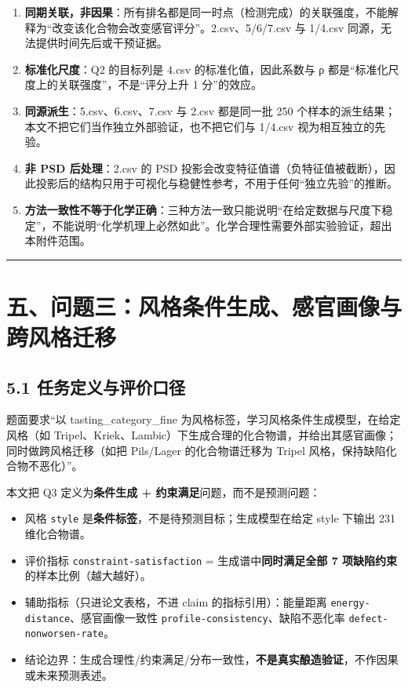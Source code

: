 \documentclass[
  11pt,
]{ctexart}
\providecommand{\tightlist}{%
  \setlength{\itemsep}{0pt}\setlength{\parskip}{0pt}}
\begin{document}
\begin{enumerate}
\def\labelenumi{\arabic{enumi}.}
\tightlist
\item
  \textbf{同期关联，非因果}：所有排名都是同一时点（检测完成）的关联强度，不能解释为``改变该化合物会改变感官评分''。2.csv、5/6/7.csv
  与 1/4.csv 同源，无法提供时间先后或干预证据。
\item
  \textbf{标准化尺度}：Q2 的目标列是 4.csv 的标准化值，因此系数与
  \textbar ρ\textbar{} 都是``标准化尺度上的关联强度''，不是``评分上升 1
  分''的效应。
\item
  \textbf{同源派生}：5.csv、6.csv、7.csv 与 2.csv 都是同一批 250
  个样本的派生结果；本文不把它们当作独立外部验证，也不把它们与 1/4.csv
  视为相互独立的先验。
\item
  \textbf{非 PSD 后处理}：2.csv 的 PSD
  投影会改变特征值谱（负特征值被截断），因此投影后的结构只用于可视化与稳健性参考，不用于任何``独立先验''的推断。
\item
  \textbf{方法一致性不等于化学正确}：三种方法一致只能说明``在给定数据与尺度下稳定''，不能说明``化学机理上必然如此''。化学合理性需要外部实验验证，超出本附件范围。
\end{enumerate}

\begin{center}\rule{0.5\linewidth}{0.5pt}\end{center}

\section{五、问题三：风格条件生成、感官画像与跨风格迁移}\label{ux4e94ux95eeux9898ux4e09ux98ceux683cux6761ux4ef6ux751fux6210ux611fux5b98ux753bux50cfux4e0eux8de8ux98ceux683cux8fc1ux79fb}

\subsection{5.1
任务定义与评价口径}\label{ux4efbux52a1ux5b9aux4e49ux4e0eux8bc4ux4ef7ux53e3ux5f84}

题面要求``以 tasting\_category\_fine
为风格标签，学习风格条件生成模型，在给定风格（如
Tripel、Kriek、Lambic）下生成合理的化合物谱，并给出其感官画像；同时做跨风格迁移（如把
Pils/Lager 的化合物谱迁移为 Tripel 风格，保持缺陷化合物不恶化）''。

本文把 Q3 定义为\textbf{条件生成 + 约束满足}问题，而不是预测问题：

\begin{itemize}
\tightlist
\item
  风格 \texttt{style}
  是\textbf{条件标签}，不是待预测目标；生成模型在给定 style 下输出 231
  维化合物谱。
\item
  评价指标 \texttt{constraint-satisfaction} =
  生成谱中\textbf{同时满足全部 7 项缺陷约束}的样本比例（越大越好）。
\item
  辅助指标（只进论文表格，不进 claim 的指标引用）：能量距离
  \texttt{energy-distance}、感官画像一致性
  \texttt{profile-consistency}、缺陷不恶化率
  \texttt{defect-nonworsen-rate}。
\item
  结论边界：生成合理性/约束满足/分布一致性，\textbf{不是真实酿造验证}，不作因果或未来预测表述。
\end{itemize}
\end{document}
